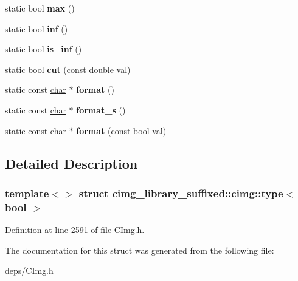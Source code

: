 \begin{DoxyCompactItemize}
static bool {\bfseries max} ()
\item 
\mbox{\label{structcimg__library__suffixed_1_1cimg_1_1type_3_01bool_01_4_a247a713e27969baff3a43cf7a55de1aa}} 
static bool {\bfseries inf} ()
\item 
\mbox{\label{structcimg__library__suffixed_1_1cimg_1_1type_3_01bool_01_4_a9a628117a65fe303cff66c4c7dea5c6e}} 
static bool {\bfseries is\+\_\+inf} ()
\item 
\mbox{\label{structcimg__library__suffixed_1_1cimg_1_1type_3_01bool_01_4_a58d55cbfed8b827807cce83e1684a636}} 
static bool {\bfseries cut} (const double val)
\item 
\mbox{\label{structcimg__library__suffixed_1_1cimg_1_1type_3_01bool_01_4_a4ffd7c16f70d93a8682da6535f65df7f}} 
static const \hyperlink{classchar}{char} $\ast$ {\bfseries format} ()
\item 
\mbox{\label{structcimg__library__suffixed_1_1cimg_1_1type_3_01bool_01_4_a5c7a51aa9a3bf231eb6667d9ae091a39}} 
static const \hyperlink{classchar}{char} $\ast$ {\bfseries format\+\_\+s} ()
\item 
\mbox{\label{structcimg__library__suffixed_1_1cimg_1_1type_3_01bool_01_4_adc9f9ca3f0202f998fd702d3771702cd}} 
static const \hyperlink{classchar}{char} $\ast$ {\bfseries format} (const bool val)
\end{DoxyCompactItemize}


\subsection{Detailed Description}
\subsubsection*{template$<$$>$\newline
struct cimg\+\_\+library\+\_\+suffixed\+::cimg\+::type$<$ bool $>$}



Definition at line 2591 of file C\+Img.\+h.



The documentation for this struct was generated from the following file\+:\begin{DoxyCompactItemize}
\item 
deps/C\+Img.\+h\end{DoxyCompactItemize}
